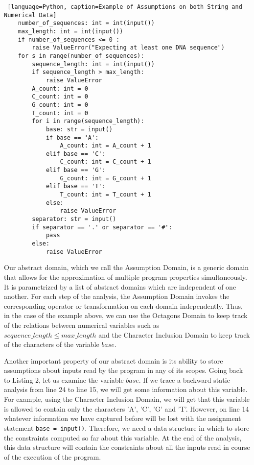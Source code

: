\documentclass[]{report}
\begin{document}
\begin{lstlisting} [language=Python, caption=Example of Assumptions on both String and Numerical Data]
	number_of_sequences: int = int(input())
	max_length: int = int(input())
	if number_of_sequences <= 0 :
		raise ValueError("Expecting at least one DNA sequence")
	for s in range(number_of_sequences):
		sequence_length: int = int(input())
		if sequence_length > max_length:
			raise ValueError
		A_count: int = 0
		C_count: int = 0
		G_count: int = 0
		T_count: int = 0
		for i in range(sequence_length):
			base: str = input()
			if base == 'A':
				A_count: int = A_count + 1
			elif base == 'C':
				C_count: int = C_count + 1
			elif base == 'G':
				G_count: int = G_count + 1
			elif base == 'T':
				T_count: int = T_count + 1
			else:
				raise ValueError
		separator: str = input()
		if separator == '.' or separator == '#':
			pass
		else:
			raise ValueError
\end{lstlisting}



Our abstract domain, which we call the Assumption Domain, is a generic domain that allows for the approximation of multiple program properties simultaneously. It is parametrized by a list of abstract domains which are independent of one another. For each step of the analysis, the Assumption Domain invokes the corresponding operator or transformation on each domain independently. Thus, in the case of the example above, we can use the Octagons Domain \cite{octagon} to keep track of the relations between numerical variables such as $sequence\_length \leq max\_length$ and the Character Inclusion Domain \cite{character} to keep track of the characters of the variable $base$.


Another important property of our abstract domain is its ability to store assumptions about inputs read by the program in any of its scopes. Going back to Listing 2, let us examine the variable $base$. If we trace a backward static analysis from line 24 to line 15, we will get some information about this variable. For example, using the Character Inclusion Domain, we will get that this variable is allowed to contain only the characters 'A', 'C', 'G' and 'T'. However, on line 14 whatever information we have captured before will be lost with the assignment statement \verb|base = input()|. Therefore, we need a data structure in which to store the constraints computed so far about this variable. At the end of the analysis, this data structure will contain the constraints about all the inputs read in course of the execution of the program. 
\end{document}
